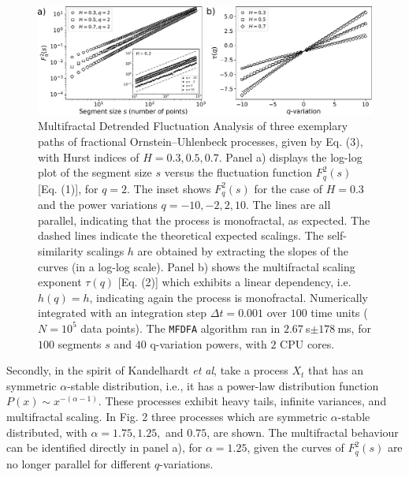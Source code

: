 \documentclass[pre, a4paper, aps, floatfix, superscriptaddress, onecolumn, notitlepage, longbibliography]{revtex4-1} %
\begin{document}
\begin{figure}[h]
  \includegraphics[width = 0.98\linewidth]{fig1.pdf}
  \caption{Multifractal Detrended Fluctuation Analysis of three exemplary paths of fractional Ornstein--Uhlenbeck processes, given by Eq. (3),  with Hurst indices of $H=0.3, 0.5, 0.7$. Panel a) displays the log-log plot of the segment size $s$ versus the fluctuation function $F_q^2(s)$ [Eq. (1)], for $q=2$.
  The inset shows $F_q^2(s)$ for the case of $H=0.3$ and the power variations $q=-10,-2,2,10$.
  The lines are all parallel, indicating that the process is monofractal, as expected.
  The dashed lines indicate the theoretical expected scalings.
  The self-similarity scalings $h$ are obtained by extracting the slopes of the curves (in a log-log scale).
  Panel b) shows the multifractal scaling exponent $\tau(q)$ [Eq. (2)] which exhibits a linear dependency, i.e. $h(q)=h$, indicating again the process is monofractal.
  Numerically integrated with an integration step $\Delta t = 0.001$ over $100$ time units ($N=10^5$ data points).
  The \texttt{MFDFA} algorithm ran in $2.67\!~$s$\pm 178\!~$ms, for $100$ segments $s$ and $40$ q-variation powers, with $2$ CPU cores.}
\end{figure}

Secondly, in the spirit of Kandelhardt \textit{et al}, take a process $X_t$ that has an symmetric $\alpha$-stable distribution, i.e., it has a power-law distribution function $P(x)\sim x^{-(\alpha-1)}$.
These processes exhibit heavy tails, infinite variances, and multifractal scaling.
In Fig. 2 three processes which are symmetric $\alpha$-stable distributed, with $\alpha = 1.75, 1.25,$ and $0.75$, are shown.
The multifractal behaviour can be identified directly in panel a), for $\alpha = 1.25$, given the curves of $F_q^2(s)$ are no longer parallel for different $q$-variations.
\end{document}

